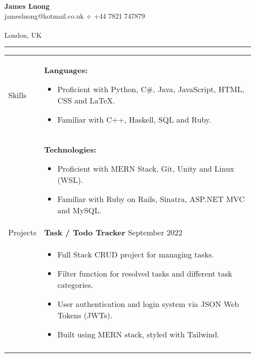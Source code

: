 \documentclass[12pt]{article}
\begin{document}
\begin{minipage}[t][0pt]{\linewidth} %
\begin{center}
	{\LARGE\textbf{James Luong}} \\
	jamesluong@hotmail.co.uk $\diamond$ +44 7821 747879 \\
	
	\href{jluong23.github.io/blog}{\color{Blue}{jluong23.github.io/blog}} \\
	
	London, UK \\
	\hrule
\end{center}


\begin{tabular}[t]{p{2cm} p{14cm}}
	{Skills} &
		\textbf{Languages:} 
	    \begin{itemize}
    		\renewcommand{\labelitemi}{$\diamond$}
    			\item Proficient with Python, C\#, Java, JavaScript, HTML, CSS and \LaTeX. 
    			\item Familiar with C++, Haskell, SQL and Ruby.
		\end{itemize} \\ &

		\textbf{Technologies:} 
	    \begin{itemize}
    		\renewcommand{\labelitemi}{$\diamond$}
    			\item Proficient with MERN Stack, Git, Unity and Linux (WSL).
    			\item Familiar with Ruby on Rails, Sinatra, ASP.NET MVC and MySQL.
		\end{itemize} \\

	{Projects} &
		\textbf{Task / Todo Tracker}  \hfill September 2022 \\ &
		\begin{itemize}
			\renewcommand{\labelitemi}{$\diamond$}
			\item Full Stack CRUD project for managing tasks.
			\item Filter function for resolved tasks and different task categories.
			\item User authentication and login system via JSON Web Tokens (JWTs).
			\item Built using MERN stack, styled with Tailwind.
		\end{itemize} \\ &
		

\end{tabular}
\end{minipage}
\end{document}
